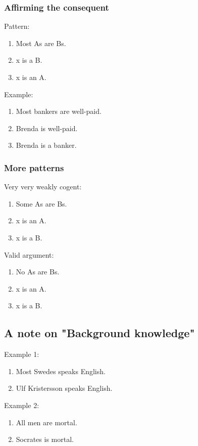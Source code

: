 \subsubsection{Affirming the consequent}

Pattern: 
\begin{enumerate}
    \item Most As are Bs.
    \item x is a B.
    \item x is an A.
\end{enumerate}

Example:
\begin{enumerate}
    \item Most bankers are well-paid.
    \item Brenda is well-paid.
    \item Brenda is a banker.
\end{enumerate}

\subsubsection{More patterns}

Very very weakly cogent:
\begin{enumerate}
    \item Some As are Bs.
    \item x is an A.
    \item x is a B.
\end{enumerate}

Valid argument:
\begin{enumerate}
    \item No As are Bs.
    \item x is an A.
    \item x is a B.
\end{enumerate}

\subsection{A note on "Background knowledge"}

Example 1:
\begin{enumerate}
    \item Most Swedes speaks English.
    \item Ulf Kristersson speaks English.
\end{enumerate}

Example 2:
\begin{enumerate}
    \item All men are mortal.
    \item Socrates is mortal.
\end{enumerate}


